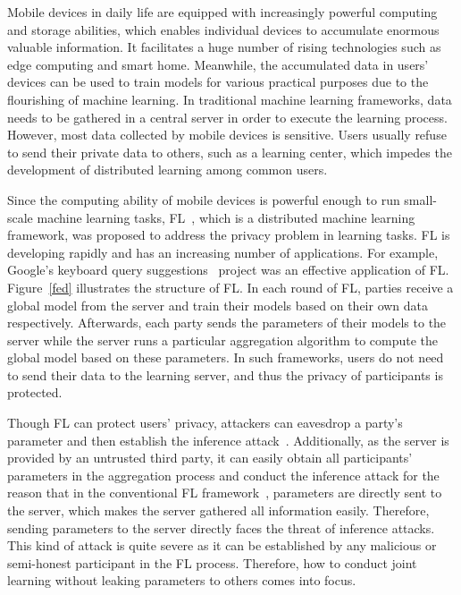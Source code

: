 Mobile devices in daily life are equipped with increasingly powerful computing and storage abilities, which enables individual devices to accumulate enormous valuable information. It facilitates a huge number of rising technologies such as edge computing and smart home. Meanwhile, the accumulated data in users' devices can be used to train models for various practical purposes due to the flourishing of machine learning. In traditional machine learning frameworks, data needs to be gathered in a central server in order to execute the learning process. However, most data collected by mobile devices is sensitive. Users usually refuse to send their private data to others, such as a learning center, which impedes the development of distributed learning among common users.

Since the computing ability of mobile devices is powerful enough to run small-scale machine learning tasks, FL~\cite{mcmahan2016communicationefficient}, which is a distributed machine learning framework, was proposed to address the privacy problem in learning tasks. FL is developing rapidly and has an increasing number of applications. For example, Google's keyboard query suggestions~\cite{yang2018applied} project was an effective application of FL. Figure~\ref{fed} illustrates the structure of FL. In each round of FL, parties receive a global model from the server and train their models based on their own data respectively. Afterwards, each party sends the parameters of their models to the server while the server runs a particular aggregation algorithm to compute the global model based on these parameters. In such frameworks, users do not need to send their data to the learning server, and thus the privacy of participants is protected.

Though FL can protect users' privacy, attackers can eavesdrop a party's parameter and then establish the inference attack~\cite{Beyond, Leakage, Nasr19}. Additionally, as the server is provided by an untrusted third party, it can easily obtain all participants' parameters in the aggregation process and conduct the inference attack for the reason that in the conventional FL framework~\cite{Nasr19}, parameters are directly sent to the server, which makes the server gathered all information easily. Therefore, sending parameters to the server directly faces the threat of inference attacks. This kind of attack is quite severe as it can be established by any malicious or semi-honest participant in the FL process. Therefore, how to conduct joint learning without leaking parameters to others comes into focus.

